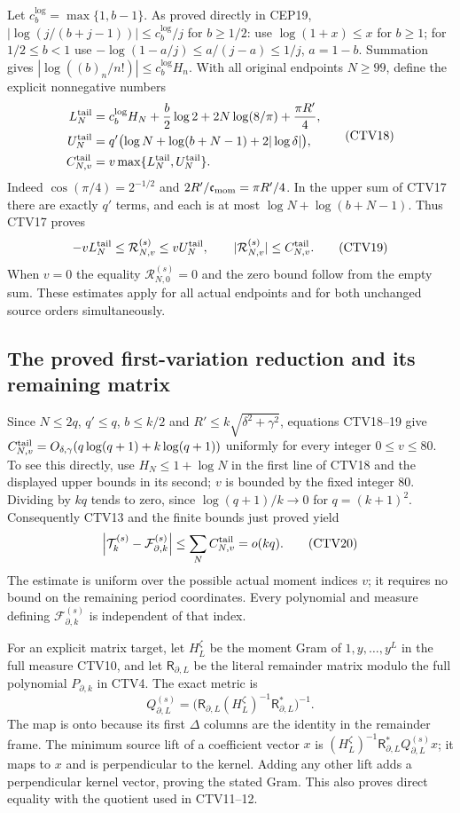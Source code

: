 \documentclass[11pt,a4paper]{article}
\begin{document}
Let $c_b^{\log}=\max\{1,b-1\}$. As proved directly in CEP19,
$|\log(j/(b+j-1))|\le c_b^{\log}/j$ for $b\ge1/2$:
use $\log(1+x)\le x$ for $b\ge1$; for $1/2\le b<1$
use $-\log(1-a/j)\le a/(j-a)\le1/j$, $a=1-b$.
Summation gives
$|\log((b)_n/n!)|\le c_b^{\log}H_n$.
With all original endpoints $N\ge99$, define the explicit
nonnegative numbers
\[
 \begin{split}
 L_N^{\rm tail}
    &=c_b^{\log}H_N+\frac b2\log2
                        +2N\log(8/\pi)+\frac{\pi R'}4,\\
 U_N^{\rm tail}
    &=q'\bigl(\log N+\log(b+N-1)+2|\log\delta|\bigr),\\
 C_{N,v}^{\rm tail}
    &=v\max\{L_N^{\rm tail},U_N^{\rm tail}\}.
 \end{split}\tag{CTV18}
\]
Indeed $\cos(\pi/4)=2^{-1/2}$ and
$2R'/\mathfrak c_{\rm mom}=\pi R'/4$.
In the upper sum of CTV17 there are exactly $q'$ terms, and
each is at most $\log N+\log(b+N-1)$.
Thus CTV17 proves
\[
 -vL_N^{\rm tail}\le\mathcal R_{N,v}^{(s)}
               \le vU_N^{\rm tail},\qquad
 |\mathcal R_{N,v}^{(s)}|\le C_{N,v}^{\rm tail}.
 \tag{CTV19}
\]
When $v=0$ the equality $\mathcal R_{N,0}^{(s)}=0$ and the
zero bound follow from the empty sum.
These estimates apply for all actual endpoints and for
both unchanged source orders simultaneously.

\subsection{The proved first-variation reduction and its remaining matrix}

Since $N\le2q$, $q'\le q$, $b\le k/2$ and
$R'\le k\sqrt{\delta^2+\gamma^2}$, equations CTV18--19 give
$C_{N,v}^{\rm tail}=O_{\delta,\gamma}(q\log(q+1)+
k\log(q+1))$ uniformly for every integer $0\le v\le80$.
To see this directly, use $H_N\le1+\log N$ in the first
line of CTV18 and the displayed upper bounds in its second;
$v$ is bounded by the fixed integer 80.
Dividing by $kq$ tends to zero, since
$\log(q+1)/k\to0$ for $q=(k+1)^2$.
Consequently CTV13 and the finite bounds just proved yield
\[
 \left|\mathcal T_k^{(s)}-\mathcal F_{\partial,k}^{(s)}\right|
        \le\sum_N C_{N,v}^{\rm tail}=o(kq).
 \tag{CTV20}
\]
The estimate is uniform over the possible actual moment indices
$v$; it requires no bound on the remaining period coordinates.
Every polynomial and measure defining
$\mathcal F_{\partial,k}^{(s)}$ is independent of that index.

For an explicit matrix target, let
$H_{L}^{\zeta}$ be the moment Gram of
$1,y,\ldots,y^L$ in the full measure CTV10, and let
$\mathsf R_{\partial,L}$ be the literal remainder matrix
modulo the full polynomial $P_{\partial,k}$ in CTV4.
The exact metric is
\[
 Q_{\partial,L}^{(s)}
  =\bigl(\mathsf R_{\partial,L}
          (H_{L}^{\zeta})^{-1}
          \mathsf R_{\partial,L}^*\bigr)^{-1}.
 \tag{CTV21}
\]
The map is onto because its first $\Delta$ columns are the
identity in the remainder frame. The minimum source lift
of a coefficient vector $x$ is
$(H_L^\zeta)^{-1}\mathsf R_{\partial,L}^*
 Q_{\partial,L}^{(s)}x$; it maps to $x$ and is perpendicular
to the kernel. Adding any other lift adds a perpendicular
kernel vector, proving the stated Gram. This also proves
direct equality with the quotient used in CTV11--12.
\end{document}
